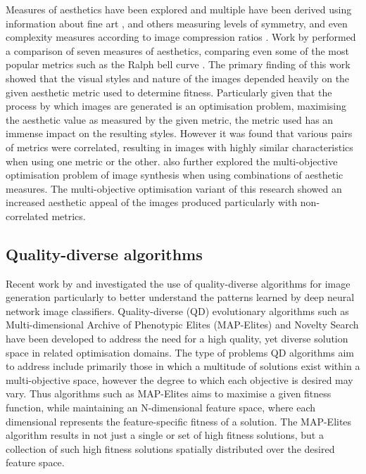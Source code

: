 \documentclass{article}
\begin{document}
Measures of aesthetics have been explored and multiple have been derived using information about fine art \citep{ralph-bell-curve}, and others measuring levels of symmetry, and even complexity measures according to image compression ratios \citep{den2010using}.
Work by \citet{den2014investigating} performed a comparison of seven measures of aesthetics, comparing even some of the most popular metrics such as the Ralph bell curve \citep{ralph-bell-curve}.
The primary finding of this work showed that the visual styles and nature of the images depended heavily on the given aesthetic metric used to determine fitness.
Particularly given that the process by which images are generated is an optimisation problem, maximising the aesthetic value as measured by the given metric, the metric used has an immense impact on the resulting styles.
However it was found that various pairs of metrics were correlated, resulting in images with highly similar characteristics when using one metric or the other.
\citet{den2014investigating} also further explored the multi-objective optimisation problem of image synthesis when using combinations of aesthetic measures.
The multi-objective optimisation variant of this research showed an increased aesthetic appeal of the images produced particularly with non-correlated metrics.


\subsection{Quality-diverse algorithms}

Recent work by \citet{nguyen2015innovation} and \citet{nguyen2015deep} investigated the use of quality-diverse algorithms for image generation particularly to better understand the patterns learned by deep neural network image classifiers.
Quality-diverse (QD) evolutionary algorithms such as Multi-dimensional Archive of Phenotypic Elites (MAP-Elites) \citep{mouret2015illuminating} and Novelty Search \citep{lehman2008exploiting, lehman2011abandoning} have been developed to address the need for a high quality, yet diverse solution space in related optimisation domains.
The type of problems QD algorithms aim to address include primarily those in which a multitude of solutions exist within a multi-objective space, however the degree to which each objective is desired may vary.
Thus algorithms such as MAP-Elites aims to maximise a given fitness function, while maintaining an N-dimensional feature space, where each dimensional represents the feature-specific fitness of a solution.
The MAP-Elites algorithm results in not just a single or set of high fitness solutions, but a collection of such high fitness solutions spatially distributed over the desired feature space.
\end{document}
